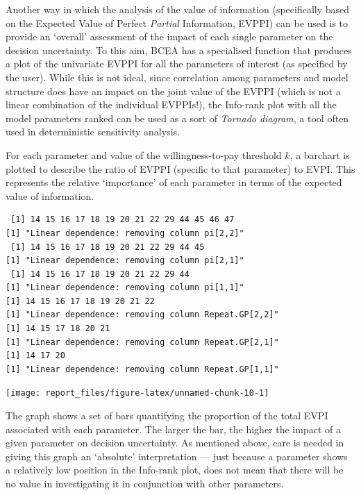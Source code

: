 \documentclass[]{article}
\begin{document}
Another way in which the analysis of the value of information
(specifically based on the Expected Value of Perfect \emph{Partial}
Information, EVPPI) can be used is to provide an `overall' assessment of
the impact of each single parameter on the decision uncertainty. To this
aim, BCEA has a specialised function that produces a plot of the
univariate EVPPI for all the parameters of interest (as specified by the
user). While this is not ideal, since correlation among parameters and
model structure does have an impact on the joint value of the EVPPI
(which is not a linear combination of the individual EVPPIs!), the
Info-rank plot with all the model parameters ranked can be used as a
sort of \emph{Tornado diagram}, a tool often used in deterministic
sensitivity analysis.

For each parameter and value of the willingness-to-pay threshold \(k\),
a barchart is plotted to describe the ratio of EVPPI (specific to that
parameter) to EVPI. This represents the relative `importance' of each
parameter in terms of the expected value of information.

\begin{verbatim}
 [1] 14 15 16 17 18 19 20 21 22 29 44 45 46 47
[1] "Linear dependence: removing column pi[2,2]"
 [1] 14 15 16 17 18 19 20 21 22 29 44 45
[1] "Linear dependence: removing column pi[2,1]"
 [1] 14 15 16 17 18 19 20 21 22 29 44
[1] "Linear dependence: removing column pi[1,1]"
[1] 14 15 16 17 18 19 20 21 22
[1] "Linear dependence: removing column Repeat.GP[2,2]"
[1] 14 15 17 18 20 21
[1] "Linear dependence: removing column Repeat.GP[2,1]"
[1] 14 17 20
[1] "Linear dependence: removing column Repeat.GP[1,1]"
\end{verbatim}

\begin{center}\texttt{[image: report\_files/figure-latex/unnamed-chunk-10-1]} \end{center}

The graph shows a set of bars quantifying the proportion of the total
EVPI associated with each parameter. The larger the bar, the higher the
impact of a given parameter on decision uncertainty. As mentioned above,
care is needed in giving this graph an `absolute' interpretation ---
just because a parameter shows a relatively low position in the
Info-rank plot, does not mean that there will be no value in
investigating it in conjunction with other parameters.
\end{document}
